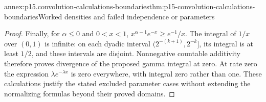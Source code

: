 \begin{annexitem}{annex:p15.convolution-calculations-boundaries}{thm:p15-convolution-calculations-boundaries}{Worked densities and failed independence or parameters}
\begin{proof}
Finally, for \(\alpha\leq0\) and \(0<x<1\),
\(x^{\alpha-1}e^{-x}\geq e^{-1}/x\).
The integral of \(1/x\) over \((0,1)\) is infinite: on
each dyadic interval \((2^{-(k+1)},2^{-k}]\), its integral
is at least \(1/2\), and these intervals are disjoint.
Nonnegative countable additivity therefore proves divergence of
the proposed gamma integral at zero. At rate zero the expression
\(\lambda e^{-\lambda x}\) is zero everywhere, with integral
zero rather than one. These calculations justify the stated
excluded parameter cases without extending the normalizing
formulas beyond their proved domains.
\end{proof}
\end{annexitem}
